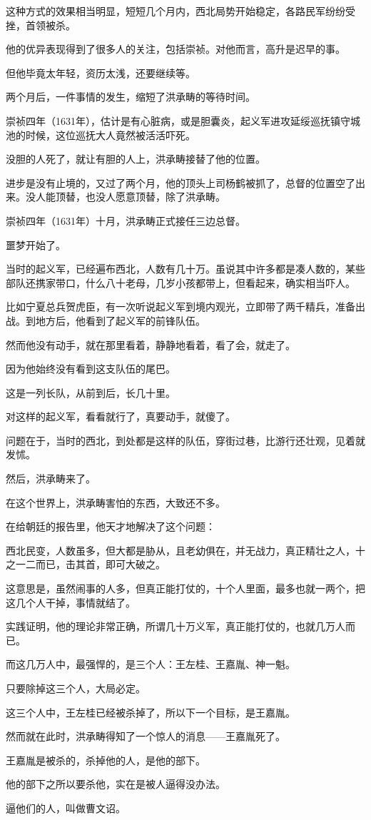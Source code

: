 \begin{multicols}{\theparacolNo}
		这种方式的效果相当明显，短短几个月内，西北局势开始稳定，各路民军纷纷受挫，首领被杀。

		他的优异表现得到了很多人的关注，包括崇祯。对他而言，高升是迟早的事。

		但他毕竟太年轻，资历太浅，还要继续等。

		两个月后，一件事情的发生，缩短了洪承畴的等待时间。

		崇祯四年（1631年），估计是有心脏病，或是胆囊炎，起义军进攻延绥巡抚镇守城池的时候，这位巡抚大人竟然被活活吓死。

		没胆的人死了，就让有胆的人上，洪承畴接替了他的位置。

		进步是没有止境的，又过了两个月，他的顶头上司杨鹤被抓了，总督的位置空了出来。没人能顶替，也没人愿意顶替，除了洪承畴。

		崇祯四年（1631年）十月，洪承畴正式接任三边总督。

		噩梦开始了。

		当时的起义军，已经遍布西北，人数有几十万。虽说其中许多都是凑人数的，某些部队还携家带口，什么八十老母，几岁小孩都带上，但看起来，确实相当吓人。

		比如宁夏总兵贺虎臣，有一次听说起义军到境内观光，立即带了两千精兵，准备出战。到地方后，他看到了起义军的前锋队伍。

		然而他没有动手，就在那里看着，静静地看着，看了会，就走了。

		因为他始终没有看到这支队伍的尾巴。

		这是一列长队，从前到后，长几十里。

		对这样的起义军，看看就行了，真要动手，就傻了。

		问题在于，当时的西北，到处都是这样的队伍，穿街过巷，比游行还壮观，见着就发怵。

		然后，洪承畴来了。

		在这个世界上，洪承畴害怕的东西，大致还不多。

		在给朝廷的报告里，他天才地解决了这个问题：

		西北民变，人数虽多，但大都是胁从，且老幼俱在，并无战力，真正精壮之人，十之一二而已，击其首，即可大破之。

		这意思是，虽然闹事的人多，但真正能打仗的，十个人里面，最多也就一两个，把这几个人干掉，事情就结了。

		实践证明，他的理论非常正确，所谓几十万义军，真正能打仗的，也就几万人而已。

		而这几万人中，最强悍的，是三个人：王左桂、王嘉胤、神一魁。

		只要除掉这三个人，大局必定。

		这三个人中，王左桂已经被杀掉了，所以下一个目标，是王嘉胤。

		然而就在此时，洪承畴得知了一个惊人的消息——王嘉胤死了。

		王嘉胤是被杀的，杀掉他的人，是他的部下。

		他的部下之所以要杀他，实在是被人逼得没办法。

		逼他们的人，叫做曹文诏。
		\ifnum{}
	\end{multicols}
\fi
\newpage
